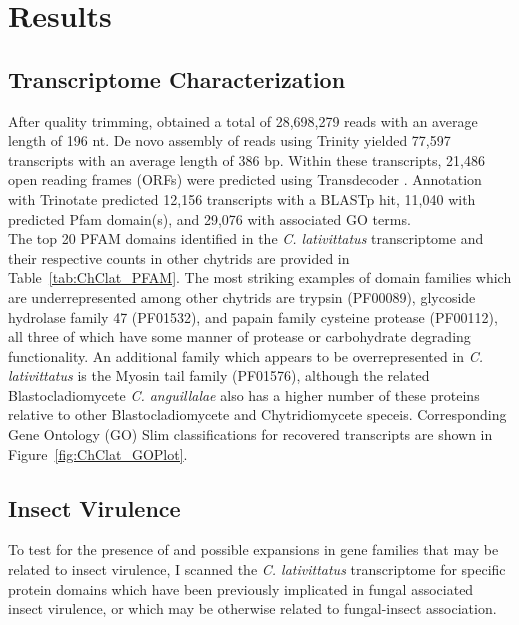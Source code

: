 \section{Results}
\subsection*{Transcriptome Characterization}
After quality trimming, obtained a total of 28,698,279 reads with an average length of 196 nt. De novo assembly of reads using Trinity \cite{Grabherr2011} yielded 77,597 transcripts with an average length of 386 bp. Within these transcripts, 21,486 open reading frames (ORFs) were predicted using Transdecoder \cite{Haas2013}. Annotation with Trinotate predicted 12,156 transcripts with a BLASTp hit, 11,040 with predicted Pfam domain(s), and 29,076 with associated GO terms. \\
\indent The top 20 PFAM domains identified in the \textit{C. lativittatus} transcriptome and their respective counts in other chytrids are provided in Table~\ref{tab:ChClat_PFAM}. The most striking examples of domain families which are underrepresented among other chytrids are trypsin (PF00089), glycoside hydrolase family 47 (PF01532), and papain family cysteine protease (PF00112), all three of which have some manner of protease or carbohydrate degrading functionality. An additional family which appears to be overrepresented in \textit{C. lativittatus} is the Myosin tail family (PF01576), although the related Blastocladiomycete \textit{C. anguillalae} also has a higher number of these proteins relative to other Blastocladiomycete and Chytridiomycete speceis. Corresponding Gene Ontology (GO) Slim classifications for recovered transcripts are shown in Figure~\ref{fig:ChClat_GOPlot}. \\
\subsection*{Insect Virulence} 
\indent To test for the presence of and possible expansions in gene families that may be related to insect virulence, I scanned the \textit{C. lativittatus} transcriptome for specific protein domains which have been previously implicated in fungal associated insect virulence, or which may be otherwise related to fungal-insect association. \\

